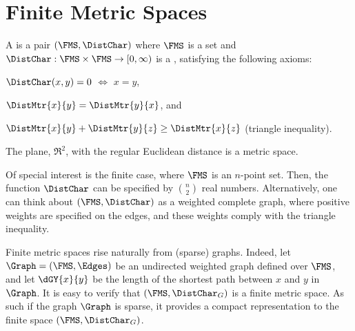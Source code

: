 %

\makeatletter
{}
\makeatother
\ifx\bookMode\undefined%
\fi


% 

\ChapterPrefix{}
\ChapterGen{}



\section{Finite Metric Spaces}



\begin{defn}
    A   is a pair
    $(\FMS, \DistChar)$ where $\FMS$ is a set and
    $\DistChar: \FMS \times \FMS \rightarrow [0, \infty)$ is a
    , satisfying the following axioms:
    \begin{compactenumi}
        \item $\DistChar(x,y) = 0$ $\iff$ $x =y$,
        \item $\DistMtr{x}{y}= \DistMtr{y}{x}$, and
        \item $\DistMtr{x}{y} + \DistMtr{y}{z} \geq \DistMtr{x}{z}$
        (triangle inequality).
    \end{compactenumi}
\end{defn}

The plane, $\Re^2$, with the regular Euclidean distance is a metric
space.

Of special interest is the finite case, where $\FMS$ is an $n$-point
set. Then, the function $\DistChar$ can be specified by $\binom{n}{2}$
real numbers. Alternatively, one can think about $(\FMS,\DistChar)$ as
a weighted complete graph, where positive weights are specified on the
edges, and these weights comply with the triangle inequality.

Finite metric spaces rise naturally from (sparse) graphs.  Indeed, let
$\Graph=(\FMS,\Edges)$ be an undirected weighted graph defined over
$\FMS$, and let $\dGY{x}{y}$ be the length of the shortest path
between $x$ and $y$ in $\Graph$. It is easy to verify that
$(\FMS, \DistChar_G)$ is a finite metric space. As such if the graph
$\Graph$ is sparse, it provides a compact representation to the finite
space $(\FMS, \DistChar_G)$.

